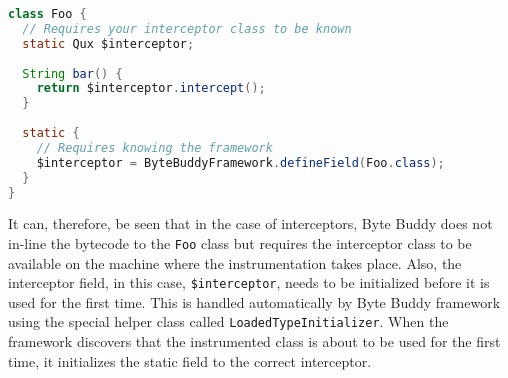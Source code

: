 \begin{lstlisting}[language=Java]
class Foo {
  // Requires your interceptor class to be known
  static Qux $interceptor;
	
  String bar() {
    return $interceptor.intercept(); 
  }
	
  static {
    // Requires knowing the framework
    $interceptor = ByteBuddyFramework.defineField(Foo.class);
  }
}
\end{lstlisting}
		
It can, therefore, be seen that in the case of interceptors, Byte Buddy does not in-line the bytecode to the \texttt{Foo} class but requires the interceptor class to be available on the machine where the instrumentation takes place. Also, the interceptor field, in this case, \texttt{\$interceptor}, needs to be initialized before it is used for the first time. This is handled automatically by Byte Buddy framework using the special helper class called \texttt{LoadedTypeInitializer}. When the framework discovers that the instrumented class is about to be used for the first time, it initializes the static field to the correct interceptor.

